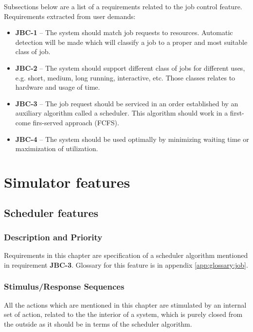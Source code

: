 \documentclass{report}
\begin{document}
Subsections below are a list of a requirements related to the job control feature.
Requirements extracted from user demands:
\begin{itemize}
	\item
	{
		\textbf{JBC-1} -- The system should match job requests to resources. Automatic detection will be made which will classify a job to a proper and most suitable class of job.
	}
	\item
	{
		\textbf{JBC-2} -- The system should support different class of jobs for different uses, e.g. short, medium, long running, interactive, etc. Those classes relates to hardware and usage of time.
	}
	\item
	{
		\textbf{JBC-3} -- The job request should be serviced in an order established by an auxiliary algorithm called a scheduler. This algorithm should work in a first-come firs-served approach (FCFS).
	}
	\item
	{
		\textbf{JBC-4} -- The system should be used optimally by minimizing waiting time or maximization of utilization.
	}
\end{itemize}


\chapter{Simulator features}

\section{Scheduler features}

\subsection{Description and Priority}
Requirements in this chapter are specification of a scheduler algorithm mentioned in requirement \textbf{JBC-3}. Glossary for this feature is in appendix \ref{app:glossary:job}.

\subsection{Stimulus/Response Sequences}
All the actions which are mentioned in this chapter are stimulated by an internal set of action, related to the the interior of a system, which is purely closed from the outside as it should be in terms of the scheduler algorithm. 
\end{document}
